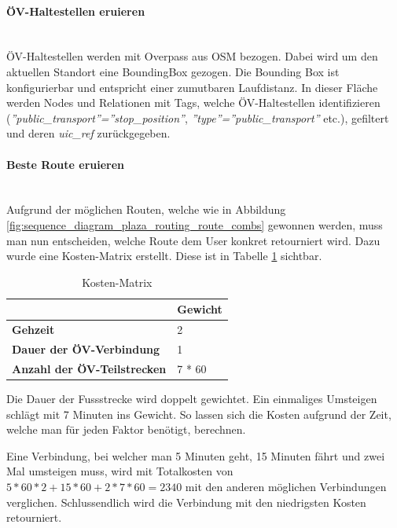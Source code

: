 \paragraph{ÖV-Haltestellen eruieren}\label{impl:Plaza Routing ÖV-Haltestellen eruieren}~\\
ÖV-Haltestellen werden mit Overpass \cite{wiki:overpass} aus \ac{OSM} bezogen. Dabei wird um den aktuellen Standort eine \gls{BoundingBox} gezogen. Die Bounding Box ist konfigurierbar und entspricht einer zumutbaren Laufdistanz. In dieser Fläche werden Nodes und Relationen mit Tags, welche ÖV-Haltestellen identifizieren (\emph{''public\_transport''=''stop\_position''}, \emph{''type''=''public\_transport''} etc.), gefiltert und deren \emph{uic\_ref} zurückgegeben.

\paragraph{Beste Route eruieren}\label{impl:Plaza Routing Beste Route eruieren}~\\
Aufgrund der möglichen Routen, welche wie in Abbildung \ref{fig:sequence_diagram_plaza_routing_route_combs} gewonnen werden, muss man nun entscheiden, welche Route dem User konkret retourniert wird. Dazu wurde eine Kosten-Matrix erstellt. Diese ist in Tabelle \ref{table:cost-matrix} sichtbar.

\begin{table}[ht]
    \centering
    \begin{tabular}{l|l}
        & \textbf{Gewicht} \\ \hline
        \textbf{Gehzeit}                    & 2                \\
        \textbf{Dauer der ÖV-Verbindung}    & 1                \\
        \textbf{Anzahl der ÖV-Teilstrecken} & 7 * 60          
    \end{tabular}
    \caption{Kosten-Matrix}
    \label{table:cost-matrix}
\end{table}

Die Dauer der Fussstrecke wird doppelt gewichtet. Ein einmaliges Umsteigen schlägt mit 7 Minuten ins Gewicht. So lassen sich die Kosten aufgrund der Zeit, welche man für jeden Faktor benötigt, berechnen.

Eine Verbindung, bei welcher man 5 Minuten geht, 15 Minuten fährt und zwei Mal umsteigen muss, wird mit Totalkosten von $5 * 60 * 2 + 15 * 60 + 2 * 7 * 60 = 2340$ mit den anderen möglichen Verbindungen verglichen. Schlussendlich wird die Verbindung mit den niedrigsten Kosten retourniert.

